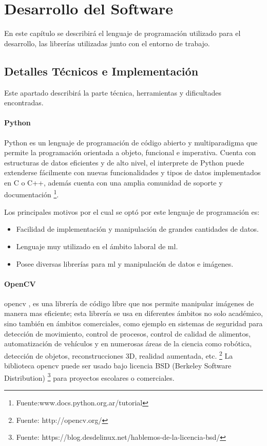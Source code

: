 \chapter{Desarrollo del Software}\label{chap:Desarrollo}
En este capítulo se describirá el lenguaje de programación utilizado para el desarrollo, las librerías utilizadas junto con el entorno de trabajo.

\section{Detalles Técnicos e Implementación}\label{sec:implementacion}
Este apartado describirá la parte técnica, herramientas y  dificultades encontradas.

\subsubsection*{Python}
Python es un lenguaje de programación de código abierto y multiparadigma que permite la programación orientada a objeto, funcional e imperativa. 
Cuenta con estructuras de datos eficientes y de alto nivel, el interprete de Python puede extenderse fácilmente  con nuevas funcionalidades y tipos 
de  datos implementados en C o C++, además cuenta con una amplia comunidad de soporte y 
documentación \footnote{Fuente:www.docs.python.org.ar/tutorial}. 

Los principales motivos por el cual se optó por este lenguaje de programación es:
\begin{itemize}
 \item Facilidad de implementación y manipulación de grandes cantidades de datos.
 \item Lenguaje muy utilizado en el ámbito laboral de \ac{ml}.
 \item Posee diversas librerías para \ac{ml} y manipulación de datos e imágenes.
\end{itemize}


\subsubsection*{OpenCV}
\ac{opencv} , es una librería de código libre que nos permite manipular imágenes de manera mas eficiente; esta librería se usa en diferentes ámbitos 
no solo académico, sino también en ámbitos comerciales, como ejemplo en sistemas de seguridad para detección de movimiento, control de procesos, 
control de calidad de alimentos, automatización de vehículos y en numerosas áreas de la ciencia como robótica, detección de objetos, reconstrucciones 
3D, realidad aumentada, etc. \footnote{Fuente: http://opencv.org/} La biblioteca \ac{opencv} puede ser usado bajo licencia BSD (Berkeley Software 
Distribution) \footnote{Fuente: https://blog.desdelinux.net/hablemos-de-la-licencia-bsd/ } para proyectos escolares o comerciales. 

